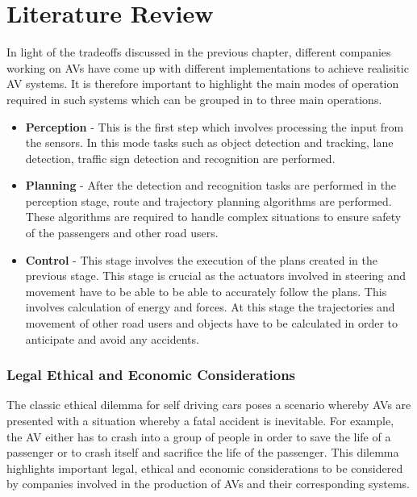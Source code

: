 \let\textcircled=\pgftextcircled



\chapter{Literature Review}
\label{chap:lit_review}

In light of the tradeoffs discussed in the previous chapter, different companies working on AVs have come up with different implementations to achieve realisitic AV systems.
It is therefore important to highlight the main modes of operation required in such systems which can be grouped in to three main operations. 
\begin{itemize}
    \item \textbf{Perception} - This is the first step which involves processing the input from the sensors. In this mode tasks such as object detection and tracking, lane detection, traffic sign detection and recognition are performed.
    \item \textbf{Planning} - After the detection and recognition tasks are performed in the perception stage, route and trajectory planning algorithms are performed. These algorithms are required to handle complex situations to ensure safety of the passengers and other road users. 
    \item \textbf{Control} - This stage involves the execution of the plans created in the previous stage. This stage is crucial as the actuators involved in steering and movement have to be able to be able to accurately follow the plans. This involves calculation of energy and forces. At this stage the trajectories and movement of other road users and objects have to be calculated in order to anticipate and avoid any accidents. 
    
\end{itemize}



\subsection{Legal Ethical and Economic Considerations}

The classic ethical dilemma for self driving cars poses a scenario whereby AVs are presented with a situation whereby a fatal accident is inevitable. For example, the AV either has to crash into a group of people in order to save the life of a passenger or to crash itself and sacrifice the life of the passenger. This dilemma highlights important legal, ethical and economic considerations to be considered by companies involved in the production of AVs and their corresponding systems. 


